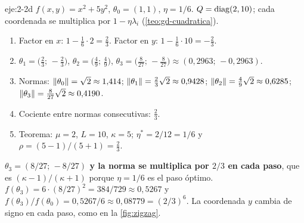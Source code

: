 \begin{solucion}{eje:2-2d}
\datos $f(x,y)=x^{2}+5y^{2}$, $\theta_0=(1,1)$, $\eta=1/6$.
\planteamiento $Q=\operatorname{diag}(2,10)$; cada coordenada se multiplica por $1-\eta\lambda_i$ (\cref{teo:gd-cuadratica}).
\pasos
\begin{enumerate}[label=\arabic*.]
  \item Factor en $x$: $1-\frac16\cdot 2=\frac23$. Factor en $y$: $1-\frac16\cdot 10=-\frac23$.
  \item $\theta_1=\bigl(\frac23;\,-\frac23\bigr)$, $\theta_2=\bigl(\frac49;\,\frac49\bigr)$, $\theta_3=\bigl(\frac{8}{27};\,-\frac{8}{27}\bigr)\approx(0{,}2963;\,-0{,}2963)$.
  \item Normas: $\lVert\theta_0\rVert=\sqrt2\approx 1{,}414$; $\lVert\theta_1\rVert=\frac23\sqrt2\approx 0{,}9428$; $\lVert\theta_2\rVert=\frac49\sqrt2\approx 0{,}6285$; $\lVert\theta_3\rVert=\frac{8}{27}\sqrt2\approx 0{,}4190$.
  \item Cociente entre normas consecutivas: $\frac23$.
  \item Teorema: $\mu=2$, $L=10$, $\kappa=5$; $\eta^{\ast}=2/12=1/6$ y $\rho=(5-1)/(5+1)=\frac23$.
\end{enumerate}
\resultado \textbf{$\theta_3=(8/27;\,-8/27)$ y la norma se multiplica por $2/3$ en cada paso}, que es $(\kappa-1)/(\kappa+1)$ porque $\eta=1/6$ es el paso óptimo.
\comprobacion $f(\theta_3)=6\cdot(8/27)^{2}=384/729\approx 0{,}5267$ y $f(\theta_3)/f(\theta_0)=0{,}5267/6\approx 0{,}08779=(2/3)^{6}$. La coordenada $y$ cambia de signo en cada paso, como en la \cref{fig:zigzag}.
\end{solucion}

